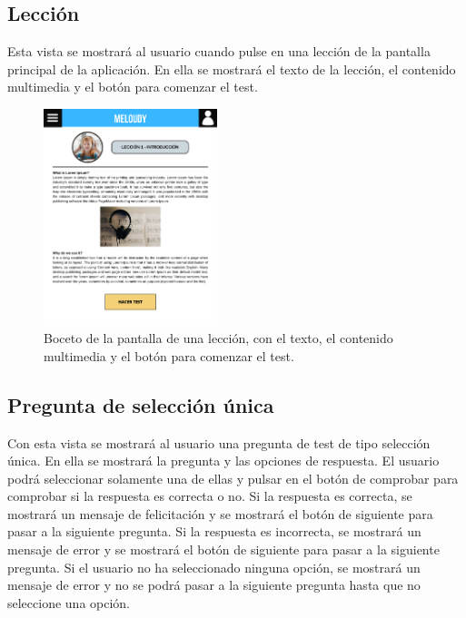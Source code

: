 \subsection*{Lección}

Esta vista se mostrará al usuario cuando pulse en una lección de la pantalla principal de la aplicación. En ella se mostrará el texto de la lección, el contenido multimedia y el botón para comenzar el test.

\begin{figure}[H]
    \centering
    \centerline{\includegraphics[width=0.45\textwidth, frame]{imagenes/c6/4.png}}
    \caption{Boceto de la pantalla de una lección, con el texto, el contenido multimedia y el botón para comenzar el test.}
    \label{fig:leccion}
\end{figure}

\newpage

\subsection*{Pregunta de selección única}

Con esta vista se mostrará al usuario una pregunta de test de tipo selección única. En ella se mostrará la pregunta y las opciones de respuesta. El usuario podrá seleccionar solamente una de ellas y pulsar en el botón de comprobar para comprobar si la respuesta es correcta o no. Si la respuesta es correcta, se mostrará un mensaje de felicitación y se mostrará el botón de siguiente para pasar a la siguiente pregunta. Si la respuesta es incorrecta, se mostrará un mensaje de error y se mostrará el botón de siguiente para pasar a la siguiente pregunta. Si el usuario no ha seleccionado ninguna opción, se mostrará un mensaje de error y no se podrá pasar a la siguiente pregunta hasta que no seleccione una opción.



